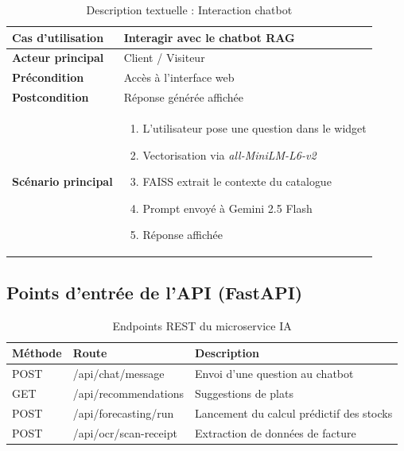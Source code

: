 \begin{table}[H]
    \centering
    \caption{Description textuelle : Interaction chatbot}
    \label{tab:desc_chatbot}
    \renewcommand{\arraystretch}{1.3}
    \begin{tabular}{|p{4cm}|p{8.5cm}|}
        \hline
        \textbf{Cas d'utilisation} & Interagir avec le chatbot RAG \\
        \hline
        \textbf{Acteur principal} & Client / Visiteur \\
        \hline
        \textbf{Précondition} & Accès à l'interface web \\
        \hline
        \textbf{Postcondition} & Réponse générée affichée \\
        \hline
        \textbf{Scénario principal} &
        \begin{enumerate}
            \item L'utilisateur pose une question dans le widget
            \item Vectorisation via \textit{all-MiniLM-L6-v2}
            \item FAISS extrait le contexte du catalogue
            \item Prompt envoyé à Gemini 2.5 Flash
            \item Réponse affichée
        \end{enumerate} \\
        \hline
    \end{tabular}
\end{table}

\subsection{Points d'entrée de l'API (FastAPI)}

\begin{table}[H]
    \centering
    \caption{Endpoints REST du microservice IA}
    \label{tab:endpoints_ia}
    \renewcommand{\arraystretch}{1.2}
    \begin{tabular}{|l|p{4.5cm}|p{5.5cm}|}
        \hline
        \textbf{Méthode} & \textbf{Route} & \textbf{Description} \\
        \hline
        POST & /api/chat/message & Envoi d'une question au chatbot \\
        \hline
        GET & /api/recommendations & Suggestions de plats \\
        \hline
        POST & /api/forecasting/run & Lancement du calcul prédictif des stocks \\
        \hline
        POST & /api/ocr/scan-receipt & Extraction de données de facture \\
        \hline
    \end{tabular}
\end{table}

